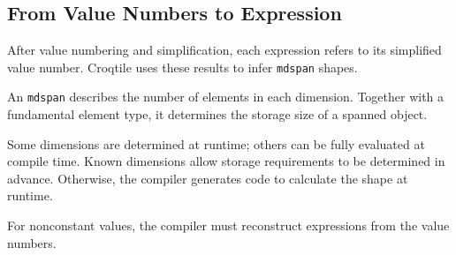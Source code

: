 \subsection*{From Value Numbers to Expression}

After value numbering and simplification, each expression refers to its simplified value number. Croqtile uses these results to infer \texttt{mdspan} shapes.

An \texttt{mdspan} describes the number of elements in each dimension. Together with a fundamental element type, it determines the storage size of a spanned object.

Some dimensions are determined at runtime; others can be fully evaluated at compile time. Known dimensions allow storage requirements to be determined in advance. Otherwise, the compiler generates code to calculate the shape at runtime.

For nonconstant values, the compiler must reconstruct expressions from the value numbers.
